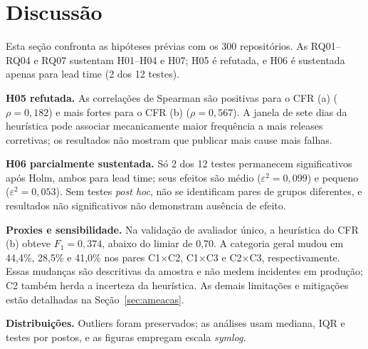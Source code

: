 \section{Discussão}
\label{sec:discussao}

Esta seção confronta as hipóteses prévias com os 300 repositórios. As RQ01--RQ04
e RQ07 sustentam H01--H04 e H07; H05 é refutada, e H06 é sustentada apenas para
lead time (2 dos 12 testes).

\textbf{H05 refutada.} As correlações de Spearman são positivas para o CFR (a)
($\rho = 0{,}182$) e mais fortes para o CFR (b) ($\rho = 0{,}567$). A janela de
sete dias da heurística pode associar mecanicamente maior frequência a mais
releases corretivas; os resultados não mostram que publicar mais cause mais
falhas.

\textbf{H06 parcialmente sustentada.} Só 2 dos 12 testes permanecem
significativos após Holm, ambos para lead time; seus efeitos são médio
($\varepsilon^2 = 0{,}099$) e pequeno ($\varepsilon^2 = 0{,}053$). Sem testes
\textit{post hoc}, não se identificam pares de grupos diferentes, e resultados
não significativos não demonstram ausência de efeito.

\textbf{Proxies e sensibilidade.} Na validação de avaliador único, a heurística
do CFR (b) obteve $F_1 = 0{,}374$, abaixo do limiar de 0,70. A
categoria geral mudou em 44,4\%, 28,5\% e 41,0\% nos pares C1$\times$C2,
C1$\times$C3 e C2$\times$C3, respectivamente. Essas mudanças são descritivas
da amostra e não medem incidentes em produção; C2 também herda a incerteza da
heurística. As demais limitações e mitigações estão detalhadas na
Seção~\ref{sec:ameacas}.

\textbf{Distribuições.} Outliers foram preservados; as análises usam mediana,
IQR e testes por postos, e as figuras empregam escala \textit{symlog}.
